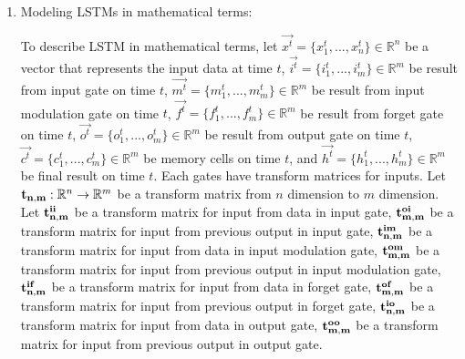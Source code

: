 \documentclass[draft,dvipsnames]{drexel-thesis}
\begin{document}
\begin{thesis}
\begin{enumerate}
		
		
	
\item Modeling LSTMs in mathematical terms:
	
	To describe LSTM in mathematical terms, let $\vec{x^t} = \{ x_1^t, ..., x_n^t\} \in \mathbb{R}^n$ be a vector that represents the input data at time $t$, $\vec{i^t} = \{i_1^t, ..., i_m^t\} \in \mathbb{R}^m$ be result from input gate on time $t$, $\vec{m^t} = \{m_1^t, ..., m_m^t\} \in \mathbb{R}^m$ be result from input modulation gate on time $t$, $\vec{f^t} = \{f_1^t, ..., f_m^t\} \in \mathbb{R}^m$ be result from forget gate on time $t$, $\vec{o^t} = \{o_1^t, ..., o_m^t\} \in \mathbb{R}^m$ be result from output gate on time $t$, $\vec{c^t} = \{c_1^t, ..., c_m^t\} \in \mathbb{R}^m$ be memory cells on time $t$, and $\vec{h^t} = \{h_1^t, ..., h_m^t\} \in \mathbb{R}^m$ be final result on time $t$.
Each gates have transform matrices for inputs. Let $\bold{t_{n,m}}: \mathbb{R}^n \rightarrow \mathbb{R}^m$ be a transform matrix from $n$ dimension to $m$ dimension. Let $\bold{t_{n,m}^{ii}}$ be a transform matrix for input from data in input gate, $\bold{t_{m,m}^{oi}}$ be a transform matrix for input from previous output in input gate, $\bold{t_{n,m}^{im}}$ be a transform matrix for input from data in input modulation gate, $\bold{t_{m,m}^{om}}$ be a transform matrix for input from previous output in input modulation gate, $\bold{t_{n,m}^{if}}$ be a transform matrix for input from data in forget gate, $\bold{t_{m,m}^{of}}$ be a transform matrix for input from previous output in forget gate, $\bold{t_{n,m}^{io}}$ be a transform matrix for input from data in output gate, $\bold{t_{m,m}^{oo}}$ be a transform matrix for input from previous output in output gate.


\end{enumerate}
\end{thesis}
\end{document}

